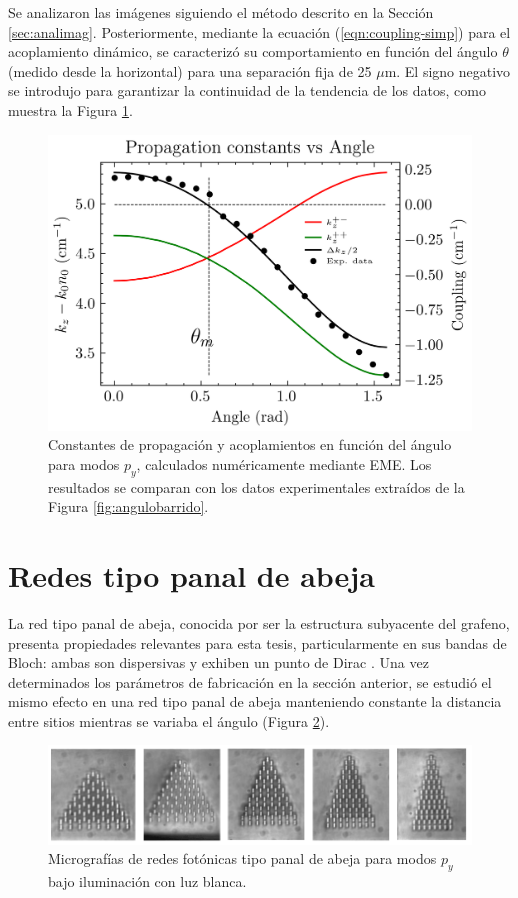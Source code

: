 Se analizaron las imágenes siguiendo el método descrito en la Sección \ref{sec:analimag}. Posteriormente, mediante la ecuación (\ref{eqn:coupling-simp}) para el acoplamiento dinámico, se caracterizó su comportamiento en función del ángulo $\theta$ (medido desde la horizontal) para una separación fija de 25 $\mu$m. El signo negativo se introdujo para garantizar la continuidad de la tendencia de los datos, como muestra la Figura \ref{fig:invisibility-coup}.

\begin{figure}[H]
    \centering
    \includegraphics[width=0.7\linewidth]{codigo/eigenvalues_vs_angle.png}
    \caption[Constantes de propagación y acoplamientos angulares para modos P]{Constantes de propagación y acoplamientos en función del ángulo para modos $p_y$, calculados numéricamente mediante EME. Los resultados se comparan con los datos experimentales extraídos de la Figura \ref{fig:angulobarrido}. \label{fig:invisibility-coup}}
\end{figure}

\section{Redes tipo panal de abeja}

La red tipo panal de abeja, conocida por ser la estructura subyacente del grafeno, presenta propiedades relevantes para esta tesis, particularmente en sus bandas de Bloch: ambas son dispersivas y exhiben un punto de Dirac \citep{honeycombdirac}. Una vez determinados los parámetros de fabricación en la sección anterior, se estudió el mismo efecto en una red tipo panal de abeja manteniendo constante la distancia entre sitios mientras se variaba el ángulo (Figura \ref{fig:HCLBW}).

\begin{figure}[H]
	\centering
	\includegraphics[width=\linewidth]{media/honeycomb_lattices_bw.png}
	\caption[Micrografías de redes fotónicas tipo panal de abeja para modos P]{Micrografías de redes fotónicas tipo panal de abeja para modos $p_y$ bajo iluminación con luz blanca. \label{fig:HCLBW}}
\end{figure}

